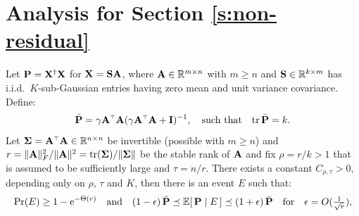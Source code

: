 \documentclass[11pt]{article}
\begin{document}

  

\newpage
\appendix

\section{Analysis for Section \ref{s:non-residual}}

\begin{theorem}%
Let $\mathbf P = \mathbf X^\dagger \mathbf X$ for $\mathbf X = \mathbf{S}\mathbf A$, where $\mathbf A \in \mathbb R^{m \times n}$ with $m \ge n$ and $\mathbf{S} \in \mathbb R^{k\times m}$ has i.i.d.~$K$-sub-Gaussian entries having zero mean and unit variance covariance. Define: 
\begin{align*}
\bar\P = \gamma \A^\top \A (\gamma \A^\top \A + \I)^{-1},\quad\text{such that}\quad\tr\,\bar\P = k.
\end{align*}
Let $\Sigmab = \A^\top \A \in \R^{n \times n}$ be invertible (possible with $m \ge n$) and $r =\| \mathbf A \|_F^2/\|\mathbf A\|^2 = \mathrm{tr}(\mathbf{\Sigma})/ \| \mathbf{\Sigma} \|$ be the stable rank of $\mathbf A$ and fix $\rho=r/k > 1$ that is assumed to be sufficiently large and $\tau = n/r$. There exists a constant
$C_{\rho,\tau}>0$, depending only on $\rho$, $\tau$ and $K$, then there is an event $E$ such that:
\begin{align*}
  \mathrm{Pr}(E)\geq 1-\mathrm{e}^{-\Theta(r)}\quad\text{and}\quad
  (1-\epsilon)\,\bar{\mathbf P}\preceq\mathbb E[\,\mathbf P\mid E\,]
  \preceq(1+\epsilon)\,\bar{\mathbf P}\quad\text{for}\quad
  \epsilon=O(\tfrac1{\sqrt r}),
\end{align*}
\end{theorem}
\end{document}
